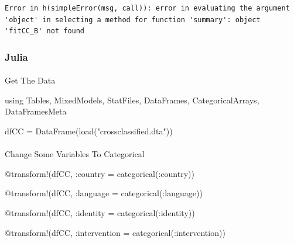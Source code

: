\documentclass[
  letterpaper,
  DIV=11,
  numbers=noendperiod]{scrreprt}
\makeatletter
\let\oldparagraph\paragraph
\renewcommand{\paragraph}{
    \@ifstar
      \xxxParagraphStar
      \xxxParagraphNoStar
  }
\newcommand{\xxxParagraphStar}[1]{\oldparagraph*{#1}\mbox{}}
\newcommand{\xxxParagraphNoStar}[1]{\oldparagraph{#1}\mbox{}}
\newenvironment{Shaded}{\begin{snugshade}}{\end{snugshade}}
\newcommand{\BuiltInTok}[1]{\textcolor[rgb]{0.00,0.23,0.31}{#1}}
\newcommand{\FunctionTok}[1]{\textcolor[rgb]{0.28,0.35,0.67}{#1}}
\newcommand{\ImportTok}[1]{\textcolor[rgb]{0.00,0.46,0.62}{#1}}
\newcommand{\NormalTok}[1]{\textcolor[rgb]{0.00,0.23,0.31}{#1}}
\newcommand{\OperatorTok}[1]{\textcolor[rgb]{0.37,0.37,0.37}{#1}}
\newcommand{\PreprocessorTok}[1]{\textcolor[rgb]{0.68,0.00,0.00}{#1}}
\newcommand{\StringTok}[1]{\textcolor[rgb]{0.13,0.47,0.30}{#1}}
\makeatother
\begin{document}
\begin{verbatim}
Error in h(simpleError(msg, call)): error in evaluating the argument 'object' in selecting a method for function 'summary': object 'fitCC_B' not found
\end{verbatim}

\subsubsection{Julia}

\paragraph{Get The Data}\label{get-the-data-13}

\begin{Shaded}
\begin{Highlighting}[]
\ImportTok{using} \BuiltInTok{Tables}\NormalTok{, }\BuiltInTok{MixedModels}\NormalTok{, }\BuiltInTok{StatFiles}\NormalTok{, }\BuiltInTok{DataFrames}\NormalTok{, }\BuiltInTok{CategoricalArrays}\NormalTok{, }\BuiltInTok{DataFramesMeta}

\NormalTok{dfCC }\OperatorTok{=} \FunctionTok{DataFrame}\NormalTok{(}\FunctionTok{load}\NormalTok{(}\StringTok{"crossclassified.dta"}\NormalTok{))}
\end{Highlighting}
\end{Shaded}

\paragraph{Change Some Variables To
Categorical}\label{change-some-variables-to-categorical-8}

\begin{Shaded}
\begin{Highlighting}[]
\PreprocessorTok{@transform}\NormalTok{!(dfCC, }\OperatorTok{:}\NormalTok{country }\OperatorTok{=} \FunctionTok{categorical}\NormalTok{(}\OperatorTok{:}\NormalTok{country))}

\PreprocessorTok{@transform}\NormalTok{!(dfCC, }\OperatorTok{:}\NormalTok{language }\OperatorTok{=} \FunctionTok{categorical}\NormalTok{(}\OperatorTok{:}\NormalTok{language))}

\PreprocessorTok{@transform}\NormalTok{!(dfCC, }\OperatorTok{:}\NormalTok{identity }\OperatorTok{=} \FunctionTok{categorical}\NormalTok{(}\OperatorTok{:}\NormalTok{identity))}

\PreprocessorTok{@transform}\NormalTok{!(dfCC, }\OperatorTok{:}\NormalTok{intervention }\OperatorTok{=} \FunctionTok{categorical}\NormalTok{(}\OperatorTok{:}\NormalTok{intervention))}
\end{Highlighting}
\end{Shaded}
\end{document}
